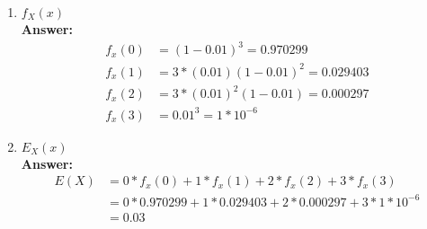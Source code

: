 \documentclass[11pt]{article}
\begin{document}
\begin{enumerate}
\item $f_{X}(x)$
\\\textbf{Answer:}
\begin{equation}
\begin{split}
f_x(0) &= (1-0.01)^3 = 0.970299\\
f_x(1) & = 3*(0.01)(1-0.01)^2 = 0.029403\\
f_x(2) & = 3*(0.01)^2(1-0.01) = 0.000297\\
f_x(3) & = 0.01^3 = 1*10^{-6}
\end{split}
\end{equation}

\item $E_{X}(x)$
\\\textbf{Answer:}
\begin{equation}
\begin{split}
E(X) &= 0*f_x(0) + 1*f_x(1)+2*f_x(2)+3*f_x(3) \\
&= 0 * 0.970299 + 1 * 0.029403 + 2*0.000297 + 3*1*10^{-6} \\
&=0.03
\end{split}
\end{equation}

\end{enumerate}
\end{document}
